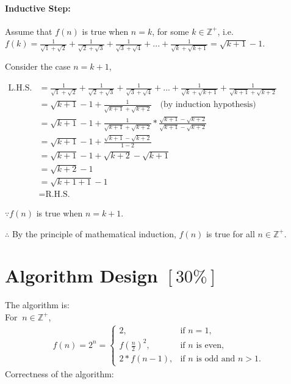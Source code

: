 \documentclass{article}
\begin{document}
\begin{enumerate}[label=(\alph*)]
\paragraph*{Inductive Step:\\}
Assume that $f(n)$ is true when $n = k$, for some $k \in \mathbb{Z}^+$, i.e. $f(k) = \frac{1}{\sqrt{1}+\sqrt{2}} + \frac{1}{\sqrt{2}+\sqrt{3}} + \frac{1}{\sqrt{3}+\sqrt{4}} + ... + \frac{1}{\sqrt{k}+\sqrt{k+1}} = \sqrt{k+1}-1$.

Consider the case $n=k+1$,

$\begin{aligned}
\text{L.H.S.} &= \frac{1}{\sqrt{1}+\sqrt{2}} + \frac{1}{\sqrt{2}+\sqrt{3}} + \frac{1}{\sqrt{3}+\sqrt{4}} + ... + \frac{1}{\sqrt{k}+\sqrt{k+1}} + \frac{1}{\sqrt{k+1}+\sqrt{k+2}} \\
&= \sqrt{k+1}-1 + \frac{1}{\sqrt{k+1}+\sqrt{k+2}} \quad \text{(by induction hypothesis)} \\
&= \sqrt{k+1}-1 + \frac{1}{\sqrt{k+1}+\sqrt{k+2}} * \frac{\sqrt{k+1}-\sqrt{k+2}}{\sqrt{k+1}-\sqrt{k+2}} \\
&= \sqrt{k+1}-1 + \frac{\sqrt{k+1}-\sqrt{k+2}}{1-2} \\
&= \sqrt{k+1}-1 + \sqrt{k+2} - \sqrt{k+1} \\
&= \sqrt{k+2} - 1 \\
&= \sqrt{k+1+1} - 1 \\
&= \text{R.H.S.}
\end{aligned}$

$\because f(n)$ is true when $n = k+1$.

$\therefore$ By the principle of mathematical induction,
$f(n)$ is true for all $n \in \mathbb{Z}^+$.

\end{enumerate}

\section{Algorithm Design $[30\%]$}

The algorithm is: \\
For $\ n \in \mathbb{Z}^+$,
\begin{align*}
f(n) = 2^n = \begin{cases}
    2, & \text{if } n = 1, \\
    f(\frac{n}{2})^2, & \text{if } n \text{ is even}, \\
    2 * f(n-1), & \text{if } n \text{ is odd and } n>1.
\end{cases}
\end{align*}
Correctness of the algorithm:
\end{document}
